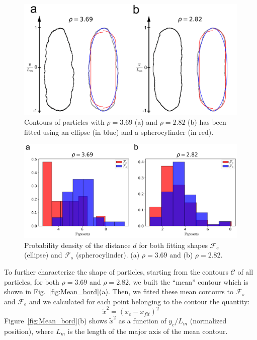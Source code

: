 \documentclass[aip,graphicx]{revtex4-1} %
\begin{document}

\begin{figure}
    \centering
    \includegraphics[width=0.95\columnwidth]{Part fit.png}
    \caption{Contours of particles with $\rho = 3.69$ (a) and $\rho = 2.82$ (b) has been fitted using an ellipse (in blue) and a 
    spherocylinder (in red).}\label{fig:Part_fit}
\end{figure}

\begin{figure}
    \centering
    \includegraphics[width=0.95\columnwidth]{Mean_dist.png}
    \caption{Probability density of the distance $d$ for both fitting shapes $\mathcal{F}_e$ (ellipse) and $\mathcal{F}_s$ 
      (spherocylinder). (a) $\rho = 3.69$ and (b) $\rho = 2.82$.}\label{fig:Mean_dist}
\end{figure}

To further characterize the shape of particles, starting from the contours $\mathcal{C}$ of all particles, for both $\rho=3.69$
and $\rho=2.82$, we built the ``mean'' contour which is shown in Fig.~\ref{fig:Mean_bord}(a).
Then, we fitted these mean contours to $\mathcal{F}_s$ and $\mathcal{F}_e$ and we calculated for each point belonging to the 
contour the quantity:
\begin{equation}
  \widetilde{x}^2 = {(x_c - x_{fit})}^2 
\end{equation}
Figure~\ref{fig:Mean_bord}(b) shows $\widetilde{x}^2$ as a function of $y_c/L_m$ (normalized position), where $L_m$ is the 
length of the major axis of the mean contour.
\end{document}

